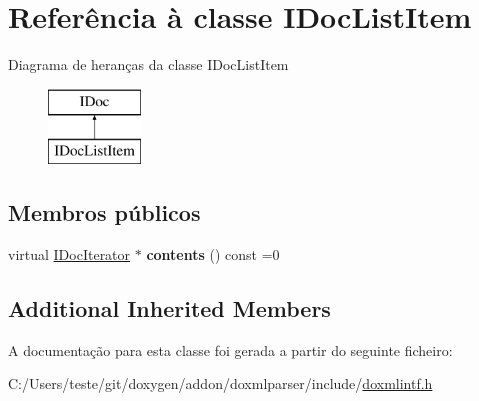 \hypertarget{class_i_doc_list_item}{\section{Referência à classe I\-Doc\-List\-Item}
\label{class_i_doc_list_item}
}
Diagrama de heranças da classe I\-Doc\-List\-Item\begin{figure}[H]
\begin{center}
\leavevmode
\includegraphics[height=2.000000cm]{class_i_doc_list_item}
\end{center}
\end{figure}
\subsection*{Membros públicos}
\begin{DoxyCompactItemize}
\item 
\hypertarget{class_i_doc_list_item_aff89b69139ea695b04d666fe2c1f963b}{virtual \hyperlink{class_i_doc_iterator}{I\-Doc\-Iterator} $\ast$ {\bfseries contents} () const =0}\label{class_i_doc_list_item_aff89b69139ea695b04d666fe2c1f963b}

\end{DoxyCompactItemize}
\subsection*{Additional Inherited Members}


A documentação para esta classe foi gerada a partir do seguinte ficheiro\-:\begin{DoxyCompactItemize}
\item 
C\-:/\-Users/teste/git/doxygen/addon/doxmlparser/include/\hyperlink{include_2doxmlintf_8h}{doxmlintf.\-h}\end{DoxyCompactItemize}
